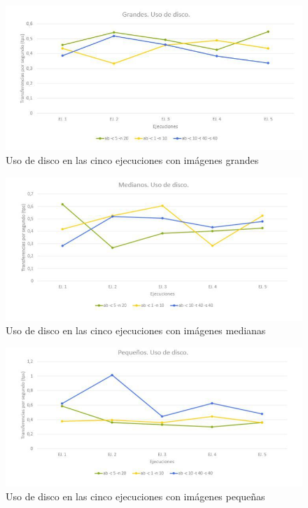 \documentclass[11pt,twoside,a4paper]{book}
\begin{document}
\begin{figure}
   \includegraphics[width=\textwidth]{grafica2.jpg}
   \caption{Uso de disco en las cinco ejecuciones con imágenes grandes}
   \label{Fig2}
\end{figure}
\begin{figure}
   \includegraphics[width=\textwidth]{grafica3.jpg}
\caption{Uso de disco en las cinco ejecuciones con imágenes medianas}   \label{Fig3}
\end{figure}
\begin{figure}
   \includegraphics[width=\textwidth]{grafica4.jpg}
   \caption{Uso de disco en las cinco ejecuciones con imágenes pequeñas}
   \label{Fig4}
\end{figure}
\end{document}
